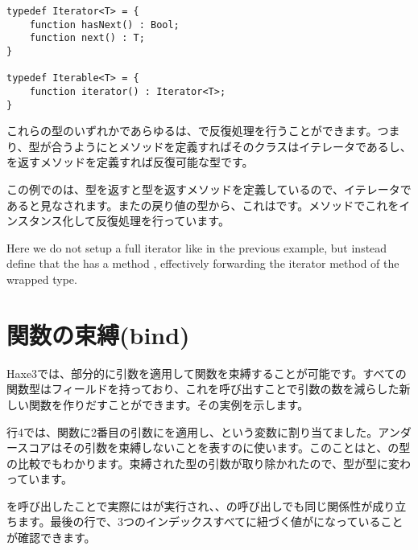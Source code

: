 \begin{lstlisting}
typedef Iterator<T> = {
	function hasNext() : Bool;
	function next() : T;
}

typedef Iterable<T> = {
	function iterator() : Iterator<T>;
}
\end{lstlisting}

これらの型のいずれかであらゆるは、で反復処理を行うことができます。つまり、型が合うようにとメソッドを定義すればそのクラスはイテレータであるし、を返すメソッドを定義すれば反復可能な型です。


この例でのは、型を返すと型を返すメソッドを定義しているので、イテレータであると見なされます。またの戻り値の型から、これはです。メソッドでこれをインスタンス化して反復処理を行っています。



Here we do not setup a full iterator like in the previous example, but instead define that the  has a method , effectively forwarding the iterator method of the wrapped  type. 


\section{関数の束縛(bind)}
\label{lf-function-bindings}

Haxe3では、部分的に引数を適用して関数を束縛することが可能です。すべての関数型はフィールドを持っており、これを呼び出すことで引数の数を減らした新しい関数を作りだすことができます。その実例を示します。


行4では、関数に2番目の引数にを適用し、という変数に割り当てました。アンダースコア\expr{_}はその引数を束縛しないことを表すのに使います。このことはと、の型の比較でもわかります。束縛された型の引数が取り除かれたので、型が型に変わっています。

を呼び出したことで実際にはが実行され、、の呼び出しでも同じ関係性が成り立ちます。最後の行で、3つのインデックスすべてに紐づく値がになっていることが確認できます。

